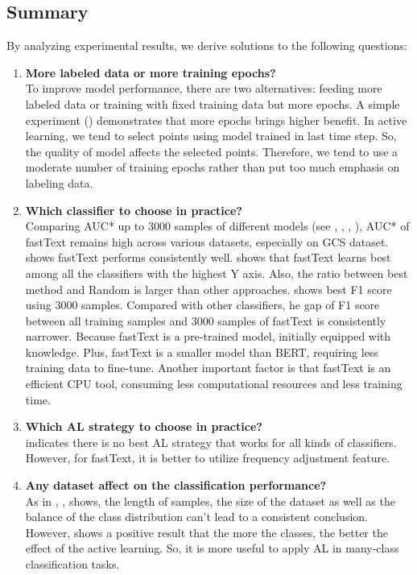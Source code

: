 \subsection{Summary}
By analyzing experimental results, we derive solutions to the following questions:
\begin{enumerate}
	\item \textbf{More labeled data or more training epochs?} \\To improve model performance, there are two alternatives: feeding more labeled data or training with fixed training data but more epochs. 
	A simple experiment () demonstrates that more epochs brings higher benefit.
	In active learning, we tend to select points using model trained in last time step. So, the quality of model affects the selected points. Therefore, we tend to use a moderate number of training epochs rather than put too much emphasis on labeling data.
	\item \textbf{Which classifier to choose in practice?}\\ Comparing AUC* up to 3000 samples of different models (see , , , ), AUC* of fastText remains high across various datasets, especially on GCS dataset.  shows fastText performs consistently well.  shows that fastText learns best among all the classifiers with the highest Y axis. Also, the ratio between best method and Random is larger than other approaches.
	 shows best F1 score using 3000 samples. Compared with other classifiers, he gap of F1 score between all training samples and 3000 samples of fastText is consistently narrower. Because fastText is a pre-trained model, initially equipped with knowledge. Plus, fastText is a smaller model than BERT, requiring less training data to fine-tune. Another important factor is that fastText is an efficient CPU tool, consuming less computational resources and less training time.
	\item \textbf{Which AL strategy to choose in practice?}\\  indicates there is no best AL strategy that works for all kinds of classifiers. However, for fastText, it is better to utilize frequency adjustment feature.
	\item \textbf{Any dataset affect on the classification performance? }\\
	As in , ,  shows, the length of samples, the size of the dataset as well as the balance of the class distribution can't lead to a consistent conclusion. However,  shows a positive result that the more the classes, the better the effect of the active learning. So, it is more useful to apply AL in many-class classification tasks.



\end{enumerate}
